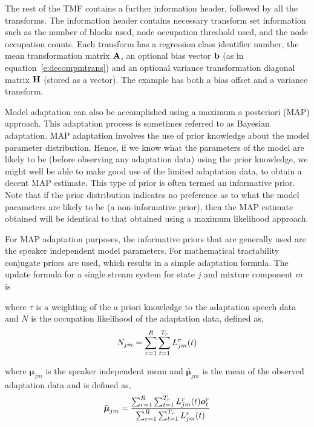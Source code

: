 The rest of the TMF contains a further information header, followed by
all the transforms. The information header contains necessary
transform set information such as the number of blocks used, node occupation
threshold used, and the node occupation counts. Each
transform has a regression class identifier number, the mean
transformation matrix ${\bf A}$, an optional bias vector ${\bf b}$ (as
in equation~\ref{e:decompmtrans}) and
an optional variance transformation diagonal matrix ${\bf H}$ 
(stored as a vector). The example has both a bias offset and a
variance transform.


Model adaptation can also be accomplished using a maximum a
posteriori (MAP) approach. 
This adaptation process is sometimes
referred to as Bayesian adaptation. MAP adaptation involves the use 
of prior knowledge about the model parameter distribution.
Hence, if we know what the parameters of the model are
likely to be (before observing any adaptation data) using the prior
knowledge, we might well be able to make good use of the limited
adaptation data, to obtain a decent MAP estimate. This type of prior
is often termed an informative prior.
Note that if the prior
distribution indicates no preference as to what the model parameters
are likely to be (a non-informative prior), then the MAP estimate
obtained will be identical to that obtained using a maximum likelihood
approach.

For MAP adaptation purposes, the informative priors that are generally
used are the speaker independent model parameters. For mathematical
tractability conjugate priors are used, which results in a simple
adaptation formula. The update formula for a 
single stream system for state $j$ and mixture component $m$ is


where $\tau$ is a weighting of the a priori knowledge to the
adaptation speech data and $N$ is the occupation likelihood of the
adaptation data, defined as,
\[
   N_{jm} = \sum_{r=1}^R \sum_{t=1}^{T_r} L^r_{jm}(t)
\]

where $\bm{\mu}_{jm}$ is the speaker independent mean 
and $\bar{\bm{\mu}}_{jm}$ is the mean of the observed adaptation
data and is defined as,
\[
   \bar{{\mbox{\boldmath $\mu$}}}_{jm} = \frac{
                \sum_{r=1}^R \sum_{t=1}^{T_r} L^r_{jm}(t){\mbox{\boldmath $o$}}^r_{t}}{\sum_{r=1}^R \sum_{t=1}^{T_r} L^r_{jm}(t)}
\]

